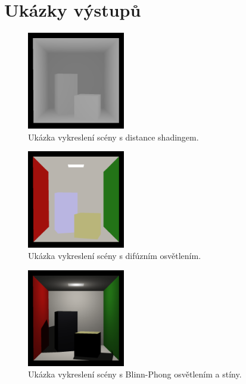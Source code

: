 \documentclass[10pt,a4paper]{article}
\begin{document}
\section{Ukázky výstupů}

\begin{figure}[H]
    \centering
    \includegraphics[width=0.38\textwidth]{images/box_render_distance.png}
    \caption{Ukázka vykreslení scény s distance shadingem.}
\end{figure}

\begin{figure}[H]
    \centering
    \includegraphics[width=0.38\textwidth]{images/box_render_diffusion.png}
    \caption{Ukázka vykreslení scény s difúzním osvětlením.}
\end{figure}

\begin{figure}[H]
    \centering
    \includegraphics[width=0.38\textwidth]{images/box_render_blinn-phong_shadows.png}
    \caption{Ukázka vykreslení scény s Blinn-Phong osvětlením a stíny.}
\end{figure}
\end{document}
